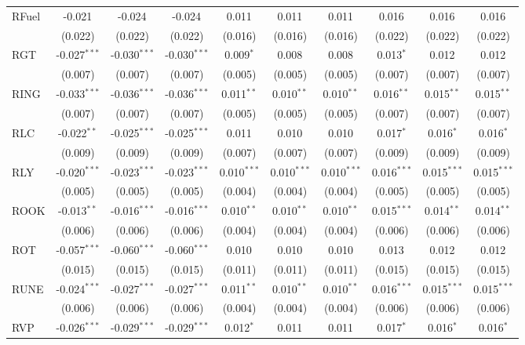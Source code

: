 \begin{table}[!htbp]
\begin{tabular}{@{\extracolsep{5pt}}lccccccccc}
 RFuel & -0.021$^{}$ & -0.024$^{}$ & -0.024$^{}$ & 0.011$^{}$ & 0.011$^{}$ & 0.011$^{}$ & 0.016$^{}$ & 0.016$^{}$ & 0.016$^{}$ \\
  & (0.022) & (0.022) & (0.022) & (0.016) & (0.016) & (0.016) & (0.022) & (0.022) & (0.022) \\
 RGT & -0.027$^{***}$ & -0.030$^{***}$ & -0.030$^{***}$ & 0.009$^{*}$ & 0.008$^{}$ & 0.008$^{}$ & 0.013$^{*}$ & 0.012$^{}$ & 0.012$^{}$ \\
  & (0.007) & (0.007) & (0.007) & (0.005) & (0.005) & (0.005) & (0.007) & (0.007) & (0.007) \\
 RING & -0.033$^{***}$ & -0.036$^{***}$ & -0.036$^{***}$ & 0.011$^{**}$ & 0.010$^{**}$ & 0.010$^{**}$ & 0.016$^{**}$ & 0.015$^{**}$ & 0.015$^{**}$ \\
  & (0.007) & (0.007) & (0.007) & (0.005) & (0.005) & (0.005) & (0.007) & (0.007) & (0.007) \\
 RLC & -0.022$^{**}$ & -0.025$^{***}$ & -0.025$^{***}$ & 0.011$^{}$ & 0.010$^{}$ & 0.010$^{}$ & 0.017$^{*}$ & 0.016$^{*}$ & 0.016$^{*}$ \\
  & (0.009) & (0.009) & (0.009) & (0.007) & (0.007) & (0.007) & (0.009) & (0.009) & (0.009) \\
 RLY & -0.020$^{***}$ & -0.023$^{***}$ & -0.023$^{***}$ & 0.010$^{***}$ & 0.010$^{***}$ & 0.010$^{***}$ & 0.016$^{***}$ & 0.015$^{***}$ & 0.015$^{***}$ \\
  & (0.005) & (0.005) & (0.005) & (0.004) & (0.004) & (0.004) & (0.005) & (0.005) & (0.005) \\
 ROOK & -0.013$^{**}$ & -0.016$^{***}$ & -0.016$^{***}$ & 0.010$^{**}$ & 0.010$^{**}$ & 0.010$^{**}$ & 0.015$^{***}$ & 0.014$^{**}$ & 0.014$^{**}$ \\
  & (0.006) & (0.006) & (0.006) & (0.004) & (0.004) & (0.004) & (0.006) & (0.006) & (0.006) \\
 ROT & -0.057$^{***}$ & -0.060$^{***}$ & -0.060$^{***}$ & 0.010$^{}$ & 0.010$^{}$ & 0.010$^{}$ & 0.013$^{}$ & 0.012$^{}$ & 0.012$^{}$ \\
  & (0.015) & (0.015) & (0.015) & (0.011) & (0.011) & (0.011) & (0.015) & (0.015) & (0.015) \\
 RUNE & -0.024$^{***}$ & -0.027$^{***}$ & -0.027$^{***}$ & 0.011$^{**}$ & 0.010$^{**}$ & 0.010$^{**}$ & 0.016$^{***}$ & 0.015$^{***}$ & 0.015$^{***}$ \\
  & (0.006) & (0.006) & (0.006) & (0.004) & (0.004) & (0.004) & (0.006) & (0.006) & (0.006) \\
 RVP & -0.026$^{***}$ & -0.029$^{***}$ & -0.029$^{***}$ & 0.012$^{*}$ & 0.011$^{}$ & 0.011$^{}$ & 0.017$^{*}$ & 0.016$^{*}$ & 0.016$^{*}$ \\

\end{tabular}
\end{table}
